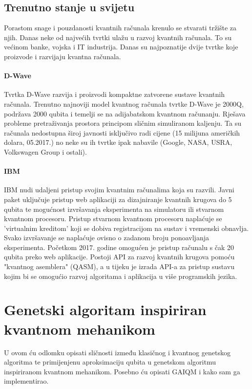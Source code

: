 \documentclass[times, utf8, zavrsni, numeric]{fer}
\begin{document}
\section{Trenutno stanje u svijetu}
Porastom snage i pouzdanosti kvantnih računala krenulo se stvarati tržište za njih. Danas neke od najvećih tvrtki ulažu u razvoj kvantnih računala. To su većinom banke, vojska i IT industrija.
Danas su najpoznatije dvije tvrtke koje proizvode i razvijaju kvantna računala.

\subsubsection{D-Wave}
Tvrtka D-Wave razvija i proizvodi kompaktne zatvorene sustave kvantnih računala. Trenutno najnoviji model kvantnog računala tvrtke D-Wave je 2000Q, podržava 2000 qubita i temelji se na adijabatskom kvantnom računanju. Rješava probleme pretraživanja prostora principom sličnim simuliranom kaljenju. Ta su računala nedostupna široj javnosti isključivo radi cijene (15 milijuna američkih dolara, 05.2017.) no neke su ih tvrtke ipak nabavile (Google, NASA, USRA, Volkswagen Group i ostali).

\subsubsection{IBM}
IBM nudi udaljeni pristup svojim kvantnim računalima koja su razvili. Javni paket uključuje pristup web aplikaciji za dizajniranje kvantnih krugova do 5 qubita te mogućnost izvršavanja eksperimenta na simulatoru ili stvarnom kvantnom procesoru. Pristup stvarnom kvantnom procesoru naplaćuje se 'virtualnim kreditom' koji se dobiva registracijom na sustav i vremenski obnavlja. Svako izvršavanje se naplaćuje ovisno o zadanom broju ponoavljanja eksperimenta. Početkom 2017. godine omogućen je pristup računalu s čak 20 qubita preko web aplikacije. Postoji API za razvoj kvantnih krugova pomoću "kvantnog asemblera" (QASM), a u tijeku je izrada API-a za pristup sustavu kojim bi se omogućio razvoj algoritama i aplikacija u više programskih jezika.

\chapter{Genetski algoritam inspiriran kvantnom mehanikom} 
\label{ch:gaiqm}
U ovom ću odlomku opisati sličnosti između klasičnog i kvantnog genetskog algoritma te primijenjenu aproksimaciju qubita u genetskom algoritmu inspiriranom kvantnom mehanikom. Posebno ću opisati GAIQM i kako sam ga implementirao.
\end{document}
